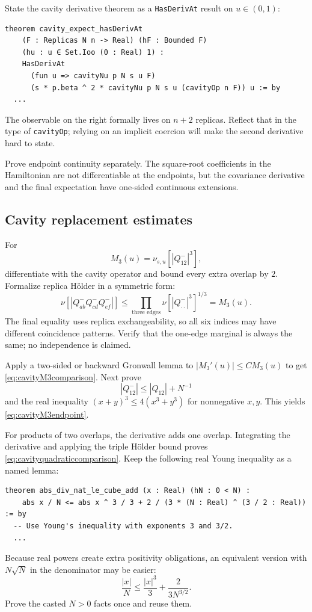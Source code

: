 \documentclass[11pt]{article}
\numberwithin{equation}{section}
\newcommand{\1}{\mathbf 1}
\begin{document}
State the cavity derivative theorem as a \texttt{HasDerivAt} result on
$u\in(0,1)$:
\begin{lstlisting}
theorem cavity_expect_hasDerivAt
    (F : Replicas N n -> Real) (hF : Bounded F)
    (hu : u ∈ Set.Ioo (0 : Real) 1) :
    HasDerivAt
      (fun u => cavityNu p N s u F)
      (s * p.beta ^ 2 * cavityNu p N s u (cavityOp n F)) u := by
  ...
\end{lstlisting}
The observable on the right formally lives on $n+2$ replicas.  Reflect that
in the type of \texttt{cavityOp}; relying on an implicit coercion will make
the second derivative hard to state.

Prove endpoint continuity separately.  The square-root coefficients in the
Hamiltonian are not differentiable at the endpoints, but the covariance
derivative and the final expectation have one-sided continuous extensions.

\subsection{Cavity replacement estimates}

For
\[
 M_3(u)=\nu_{s,u}[|Q^-_{12}|^3],
\]
differentiate with the cavity operator and bound every extra overlap by $2$.
Formalize replica H\"older in a symmetric form:
\[
 \nu[|Q^-_{ab}Q^-_{cd}Q^-_{ef}|]
 \le\prod_{\text{three edges}}
      \nu[|Q^-_{\cdot\cdot}|^3]^{1/3}
 =M_3(u).
\]
The final equality uses replica exchangeability, so all six indices may have
different coincidence patterns.  Verify that the one-edge marginal is
always the same; no independence is claimed.

Apply a two-sided or backward Gronwall lemma to
$|M_3'(u)|\le CM_3(u)$ to get
\eqref{eq:cavityM3comparison}.  Next prove
\[
 |Q^-_{12}|\le |Q_{12}|+N^{-1}
\]
and the real inequality $(x+y)^3\le4(x^3+y^3)$ for nonnegative $x,y$.
This yields \eqref{eq:cavityM3endpoint}.

For products of two overlaps, the derivative adds one overlap.  Integrating
the derivative and applying the triple H\"older bound proves
\eqref{eq:cavityquadraticcomparison}.  Keep the following real Young
inequality as a named lemma:
\begin{lstlisting}
theorem abs_div_nat_le_cube_add (x : Real) (hN : 0 < N) :
    abs x / N <= abs x ^ 3 / 3 + 2 / (3 * (N : Real) ^ (3 / 2 : Real)) := by
  -- Use Young's inequality with exponents 3 and 3/2.
  ...
\end{lstlisting}
Because real powers create extra positivity obligations, an equivalent
version with $N\sqrt N$ in the denominator may be easier:
\[
 \frac{|x|}{N}\le\frac{|x|^3}{3}+\frac{2}{3N^{3/2}}.
\]
Prove the casted $N>0$ facts once and reuse them.
\end{document}
